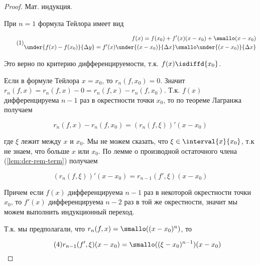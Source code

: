\begin{proof}
  Мат. индукция. 
  

  При \(n = 1\) формула Тейлора имеет вид

  \begin{equation*} \label{eq:T-Peano-1} \tag{1}
    \begin{aligned}
      f(x) = f(x_0) + f'(x)(x - x_0) + \smallo(x - x_0)
    \\
      \under{f(x) - f(x_0)}{\Delta y}
      = f'(x) \under{(x - x_0)}{\Delta x}
      \smallo \under{(x - x_0)}{\Delta x}
    \end{aligned}
  \end{equation*}
  
  Это верно по критерию дифференцируемости, т.к. \(f(x) \isdiffd{x_0}\).


  Если в формуле Тейлора \(x = x_0\), то \(r_n(f, x_0) = 0\). Значит \(r_n(f, x)
  = r_n(f, x) - 0 = r_n(f, x) - r_n(f, x_0)\). Т.к. \(f(x)\) дифференцируема \(n
  - 1\) раз в окрестности точки \(x_0\), то по теореме Лагранжа получаем

  \begin{equation*} \label{eq:T-Peano-2} \tag{2}
    r_n(f, x) - r_n(f, x_0) = (r_n(f, \xi))' (x - x_0)
  \end{equation*}

  где \(\xi\) лежит между \(x\) и \(x_0\). Мы не можем сказать, что \(\xi \in
  \interval{x}{x_0}\), т.к не знаем, что больше \(x\) или \(x_0\). По лемме о
  производной остаточного члена (\ref{lem:der-rem-term}) получаем

  \begin{equation*} \label{eq:T-Peano-3} \tag{3}
    (r_n(f, \xi))'(x - x_0) = r_{n - 1}(f', \xi)(x - x_0)
  \end{equation*}

  Причем если \(f(x)\) дифференцируема \(n - 1\) раз в некоторой окрестности
  точки \(x_0\), то \(f'(x)\) дифференцируема \(n - 2\) раз в той же
  окрестности, значит мы можем выполнить индукционный переход.

  Т.к. мы предполагали, что \(r_n(f, x) = \smallo((x - x_0)^n)\), то

  \begin{equation*} \label{eq:T-Peano-4} \tag{4}
    r_{n - 1}(f', \xi)(x - x_0) = \smallo((\xi - x_0)^{n - 1})(x - x_0)
  \end{equation*}


\end{proof}
